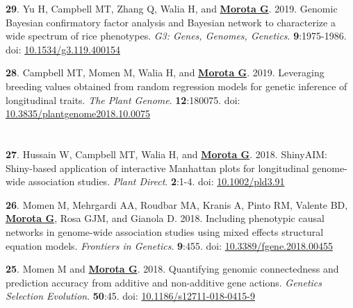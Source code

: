 \documentclass[margin,line,10pt]{res}
\newenvironment{list1}{
  \begin{list}{\ding{113}}{%
      \setlength{\itemsep}{0in}
      \setlength{\parsep}{0in} \setlength{\parskip}{0in}
      \setlength{\topsep}{0in} \setlength{\partopsep}{0in} 
      \setlength{\leftmargin}{0.17in}}}{\end{list}}
\begin{document}
\begin{resume}
\begin{list1}
     \vspace{0.5cm}

\item  [{\bf 29}.] Yu H, Campbell MT, Zhang Q, Walia H, and \textbf{\underline{Morota G}}. 2019. Genomic Bayesian confirmatory factor analysis and Bayesian network to characterize a wide spectrum of rice phenotypes. \emph{G3: Genes, Genomes, Genetics}. \textbf{9}:1975-1986. doi: \textcolor{blue}{\href{https://doi.org/10.1534/g3.119.400154}{10.1534/g3.119.400154}}

  \vspace{0.5cm}
  
\item  [{\bf 28}.] Campbell MT, Momen M, Walia H, and \textbf{\underline{Morota G}}. 2019. Leveraging breeding values obtained from random regression models for genetic inference of longitudinal traits. \emph{The Plant Genome}. \textbf{12}:180075. doi: \textcolor{blue}{\href{https://doi.org/10.3835/plantgenome2018.10.0075}{10.3835/plantgenome2018.10.0075}}

\end{list1}


\section{}
\begin{list1}

\item  [{\bf 27}.] Hussain W, Campbell MT, Walia H, and \textbf{\underline{Morota G}}. 2018. ShinyAIM: Shiny-based application of interactive Manhattan plots for longitudinal genome-wide association studies. \emph{Plant Direct}. \textbf{2}:1-4. doi: \textcolor{blue}{\href{https://doi.org/10.1002/pld3.91}{10.1002/pld3.91}}

   \vspace{0.5cm}
  
\item  [{\bf 26}.] Momen M, Mehrgardi AA, Roudbar MA, Kranis A, Pinto RM, Valente BD, \textbf{\underline{Morota G}}, Rosa GJM, and Gianola D. 2018. Including phenotypic causal networks in genome-wide association studies using mixed effects structural equation models. \emph{Frontiers in Genetics}. \textbf{9}:455. doi: \textcolor{blue}{\href{https://doi.org/10.3389/fgene.2018.00455}{10.3389/fgene.2018.00455}}

  \vspace{0.5cm}
  
\item  [{\bf 25}.] Momen M and  \textbf{\underline{Morota G}}. 2018. Quantifying genomic connectedness and prediction accuracy from additive and non-additive gene actions. \emph{Genetics Selection Evolution}. \textbf{50}:45. doi: \textcolor{blue}{\href{https://doi.org/10.1186/s12711-018-0415-9}{10.1186/s12711-018-0415-9}}


\end{list1}
\end{resume}
\end{document}

